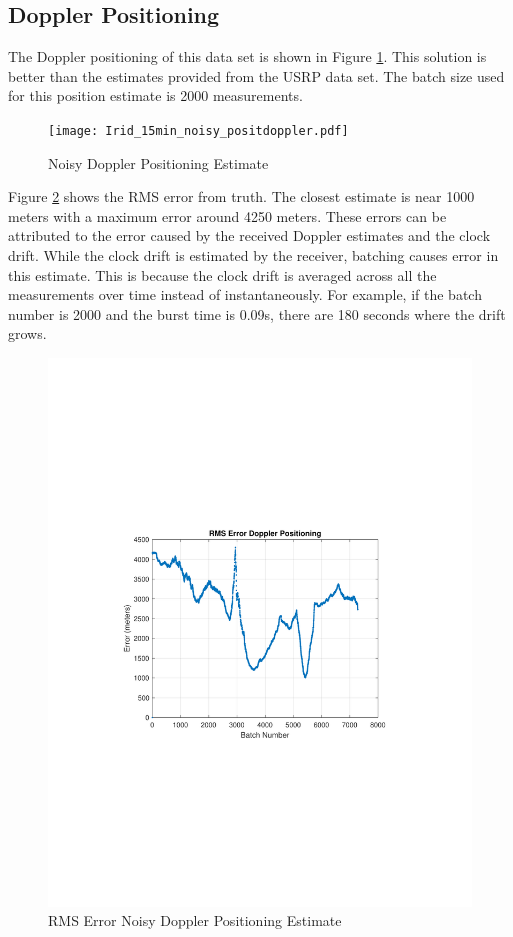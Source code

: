 \documentclass[12pt]{report}
\begin{document}
\subsection{Doppler Positioning}
The Doppler positioning of this data set is shown in Figure \ref{fig:DirtyDoppler15minIridPosit}. This solution is better than the estimates provided from the USRP data set. The batch size used for this position estimate is 2000 measurements. 
\begin{figure}[h!]
    \centering
    \texttt{[image: Irid\_15min\_noisy\_positdoppler.pdf]}
    \caption{Noisy Doppler Positioning Estimate}
    \label{fig:DirtyDoppler15minIridPosit}
\end{figure}

Figure \ref{fig:DirtyDoppler15minIridPositrmse} shows the RMS error from truth. The closest estimate is near 1000 meters with a maximum error around 4250 meters. These errors can be attributed to the error caused by the received Doppler estimates and the clock drift. While the clock drift is estimated by the receiver, batching causes error in this estimate. This is because the clock drift is averaged across all the measurements over time instead of instantaneously. For example, if the batch number is 2000 and the burst time is 0.09s, there are 180 seconds where the drift grows. 

\begin{figure}[h!]
    \centering
    \includegraphics[trim=1.2in 3.3in 1.75in 3.3in,clip,width=5in]
    {Irid_15min_noisy_RMSEdoppler.pdf}
    \caption{RMS Error Noisy Doppler Positioning Estimate}
    \label{fig:DirtyDoppler15minIridPositrmse}
\end{figure}
\end{document}
